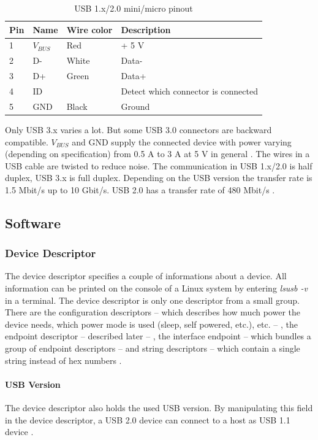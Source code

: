 \documentclass{acm_proc_article-sp}
\begin{document}
\begin{table}
\centering
\caption{USB 1.x/2.0 mini/micro pinout}
\begin{tabular}{|l|l|l|l|} \hline
Pin & Name & Wire color & Description\\ \hline
1 & $V_{BUS}$ & Red & + 5 V\\ \hline
2 & D- & White & Data-\\ \hline
3 & D+ & Green & Data+\\ \hline
4 & ID &  & Detect which connector is connected\\ \hline
5 & GND & Black & Ground\\ \hline
\end{tabular}
\end{table}

Only USB 3.x varies a lot. But some USB 3.0 connectors are backward compatible.
$V_{BUS}$ and GND supply the connected device with power varying (depending on specification) from 0.5 A to 3 A at 5 V in general \cite{beyond}.
The wires in a USB cable are twisted to reduce noise.
The communication in USB 1.x/2.0 is half duplex, USB 3.x is full duplex.
Depending on the USB version the transfer rate is 1.5 Mbit/s up to 10 Gbit/s.
USB 2.0 has a transfer rate of 480 Mbit/s \cite{beyond}.

\subsection{Software} %
\subsubsection{Device Descriptor} %
The device descriptor specifies a couple of informations about a device.
All information can be printed on the console of a Linux system by entering \emph{lsusb -v} in a terminal.
The device descriptor is only one descriptor from a small group.
There are the configuration descriptors -- which describes how much power the device needs,
which power mode is used (sleep, self powered, etc.), etc. -- ,
the endpoint descriptor -- described later -- , the interface endpoint -- which bundles a group of
endpoint descriptors -- and string descriptors -- which contain a single string instead of hex numbers \cite{beyond}.

\paragraph{USB Version}
The device descriptor also holds the used USB version.
By manipulating this field in the device descriptor, a USB 2.0 device can connect to a host as USB 1.1 device \cite{beyond}.
\end{document}
